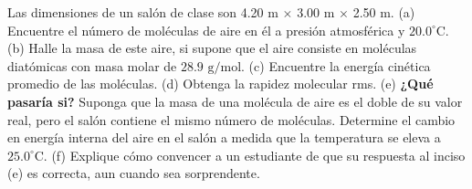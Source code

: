 \item Las dimensiones de un salón de clase son 4.20 m $\times$ 3.00 m $\times$ 2.50 m. (a) Encuentre el número de moléculas de aire en él a presión atmosférica y $20.0^\circ\text{C}$. (b) Halle la masa de este aire, si supone que el aire consiste en moléculas diatómicas con masa molar de $28.9\text{ g/mol}$. (c) Encuentre la energía cinética promedio de las moléculas. (d) Obtenga la rapidez molecular rms. (e) \textbf{¿Qué pasaría si?} Suponga que la masa de una molécula de aire es el doble de su valor real, pero el salón contiene el mismo número de moléculas. Determine el cambio en energía interna del aire en el salón a medida que la temperatura se eleva a $25.0^\circ\text{C}$. (f) Explique cómo convencer a un estudiante de que su respuesta al inciso (e) es correcta, aun cuando sea sorprendente.
